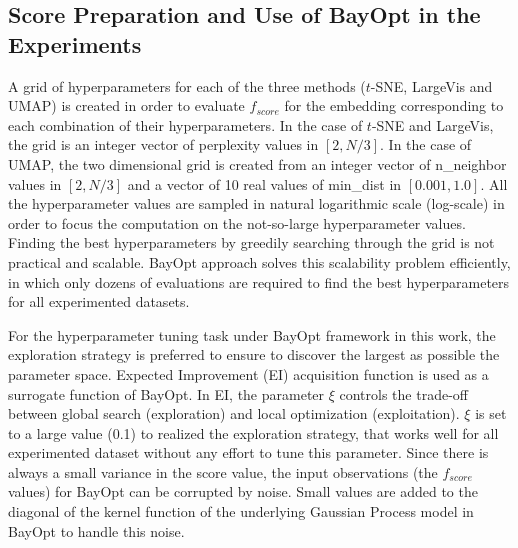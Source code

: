 \subsection{Score Preparation and Use of BayOpt in the Experiments}\label{sec:xp:proof}


A grid of hyperparameters for each of the three methods ($t$-SNE, LargeVis and UMAP) is created in order to evaluate $f_{score}$ for the embedding corresponding to each combination of their hyperparameters.
In the case of $t$-SNE and LargeVis, the grid is an integer vector of perplexity values in $[2,N/3]$.
In the case of UMAP, the two dimensional grid is created from an integer vector of {n\_neighbor} values in $[2,N/3]$ and a vector of 10 real values of {min\_dist} in $[0.001, 1.0]$.
All the hyperparameter values are sampled in natural logarithmic scale (log-scale) in order to focus the computation on the not-so-large hyperparameter values.
Finding the best hyperparameters by greedily searching through the grid is not practical and scalable.
BayOpt approach solves this scalability problem efficiently, in which only dozens of evaluations are required to find the best hyperparameters for all experimented datasets.

For the hyperparameter tuning task under BayOpt framework in this work, the exploration strategy is preferred to ensure to discover the largest as possible the parameter space.
Expected Improvement (EI) acquisition function is used as a surrogate function of BayOpt.
In EI, the parameter $\xi$ controls the trade-off between global search (exploration) and local optimization (exploitation).
$\xi$ is set to a large value (0.1) to realized the exploration strategy, that works well for all experimented dataset without any effort to tune this parameter.
Since there is always a small variance in the score value, 
the input observations (the $f_{score}$ values) for BayOpt can be corrupted by noise.
Small values are added to the diagonal of the kernel function of the underlying Gaussian Process model in BayOpt to handle this noise.


